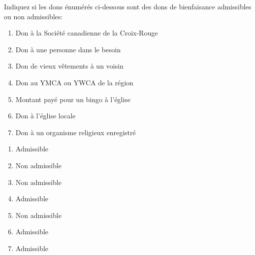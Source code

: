\begin{question}
	Indiquez si les dons énumérés ci-dessous sont des dons de bienfaisance admissibles ou non admissibles:
	\begin{enumerate}[label=\Alph*{}.]
		\item Don à la Société canadienne de la Croix-Rouge 	
		\item Don à une personne dans le besoin 	
		\item Don de vieux vêtements à un voisin 	
		\item Don au YMCA ou YWCA de la région 	
		\item Montant payé pour un bingo à l'église 	
		\item Don à l'église locale 	
		\item Don à un organisme religieux enregistré
	\end{enumerate}
\end{question}
\begin{enumerate}[label=\Alph*{}.]
	\item Admissible
	\item Non admissible
	\item Non admissible
	\item Admissible
	\item Non admissible
	\item Admissible
	\item Admissible
\end{enumerate}

